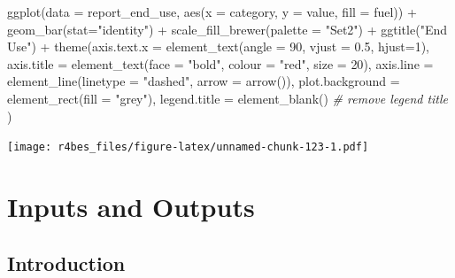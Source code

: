 \documentclass[
]{book}
\newenvironment{Shaded}{\begin{snugshade}}{\end{snugshade}}
\newcommand{\AttributeTok}[1]{\textcolor[rgb]{0.77,0.63,0.00}{#1}}
\newcommand{\CommentTok}[1]{\textcolor[rgb]{0.56,0.35,0.01}{\textit{#1}}}
\newcommand{\DecValTok}[1]{\textcolor[rgb]{0.00,0.00,0.81}{#1}}
\newcommand{\FloatTok}[1]{\textcolor[rgb]{0.00,0.00,0.81}{#1}}
\newcommand{\FunctionTok}[1]{\textcolor[rgb]{0.00,0.00,0.00}{#1}}
\newcommand{\NormalTok}[1]{#1}
\newcommand{\SpecialCharTok}[1]{\textcolor[rgb]{0.00,0.00,0.00}{#1}}
\newcommand{\StringTok}[1]{\textcolor[rgb]{0.31,0.60,0.02}{#1}}
\begin{document}
\begin{Shaded}
\begin{Highlighting}[]
\FunctionTok{ggplot}\NormalTok{(}\AttributeTok{data =}\NormalTok{ report\_end\_use, }\FunctionTok{aes}\NormalTok{(}\AttributeTok{x =}\NormalTok{ category, }\AttributeTok{y =}\NormalTok{ value, }\AttributeTok{fill =}\NormalTok{ fuel)) }\SpecialCharTok{+}
    \FunctionTok{geom\_bar}\NormalTok{(}\AttributeTok{stat=}\StringTok{"identity"}\NormalTok{) }\SpecialCharTok{+} 
    \FunctionTok{scale\_fill\_brewer}\NormalTok{(}\AttributeTok{palette =} \StringTok{"Set2"}\NormalTok{) }\SpecialCharTok{+}
    \FunctionTok{ggtitle}\NormalTok{(}\StringTok{"End Use"}\NormalTok{) }\SpecialCharTok{+}
    \FunctionTok{theme}\NormalTok{(}\AttributeTok{axis.text.x =} \FunctionTok{element\_text}\NormalTok{(}\AttributeTok{angle =} \DecValTok{90}\NormalTok{, }\AttributeTok{vjust =} \FloatTok{0.5}\NormalTok{, }\AttributeTok{hjust=}\DecValTok{1}\NormalTok{),}
          \AttributeTok{axis.title =} \FunctionTok{element\_text}\NormalTok{(}\AttributeTok{face =} \StringTok{"bold"}\NormalTok{, }
                                    \AttributeTok{colour =} \StringTok{"red"}\NormalTok{,}
                                    \AttributeTok{size =} \DecValTok{20}\NormalTok{),}
          \AttributeTok{axis.line =} \FunctionTok{element\_line}\NormalTok{(}\AttributeTok{linetype =} \StringTok{"dashed"}\NormalTok{, }
                                   \AttributeTok{arrow =} \FunctionTok{arrow}\NormalTok{()),}
          \AttributeTok{plot.background =} \FunctionTok{element\_rect}\NormalTok{(}\AttributeTok{fill =} \StringTok{"grey"}\NormalTok{),}
          \AttributeTok{legend.title =} \FunctionTok{element\_blank}\NormalTok{() }\CommentTok{\# remove legend title}
\NormalTok{          )}
\end{Highlighting}
\end{Shaded}

\texttt{[image: r4bes\_files/figure-latex/unnamed-chunk-123-1.pdf]}

\hypertarget{part-inputs-and-outputs}{%
\part{Inputs and Outputs}\label{part-inputs-and-outputs}}

\hypertarget{input-output}{%
\chapter{Introduction}\label{input-output}}
\end{document}
